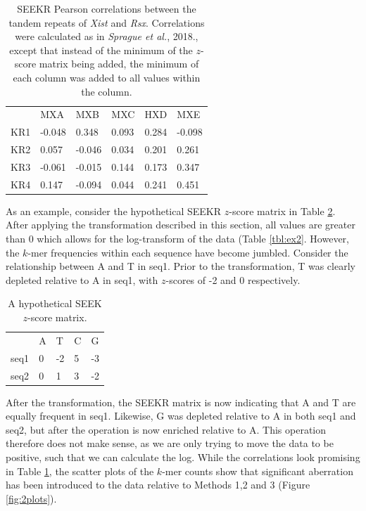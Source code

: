 \begin{table}[ht]
\begin{center}
\begin{tabular}{llllll}
&MXA & MXB                  & MXC                   & HXD                 & MXE                                      \\
KR1 & -0.048 & 0.348    & 0.093 & 0.284  & -0.098 \\
KR2 & 0.057  & -0.046 & 0.034 & 0.201 & 0.261  \\
KR3 & -0.061 & -0.015 & 0.144 & 0.173 & 0.347  \\
KR4 & 0.147   & -0.094  & 0.044 & 0.241 & 0.451 
\end{tabular}
\caption[Column-wise minimum addition to $z$-scores]{SEEKR Pearson correlations between the tandem repeats of \emph{Xist} and \emph{Rsx}. Correlations were calculated as in \emph{Sprague et al.}, 2018., except that instead of the minimum of the $z$-score matrix being added, the minimum of each column was added to all values within the column.}
\label{tbl:kmers4}
\end{center}
\end{table}
As an example, consider the hypothetical SEEKR $z$-score matrix in Table \ref{tbl:ex1}. After applying the transformation described in this section, all values are greater than 0 which allows for the log-transform of the data (Table \ref{tbl:ex2}. However, the $k$-mer frequencies within each sequence have become jumbled. Consider the relationship between A and T in seq1. Prior to the transformation, T was clearly depleted relative to A in seq1, with $z$-scores of -2 and 0 respectively. 
\begin{table}[h!]
\begin{center}
\begin{tabular}{lllll}
&A & T                   & C                  & G                                                    \\
seq1 & 0 & -2   & 5  & -3 \\
seq2 & 0   & 1 & 3 & -2 
\end{tabular}
\caption{A hypothetical SEEK $z$-score matrix.}
\label{tbl:ex1}
\end{center}
\end{table}
After the transformation, the SEEKR matrix is now indicating that A and T are equally frequent in seq1. Likewise, G was depleted relative to A in both seq1 and seq2, but after the operation is now enriched relative to A.  This operation therefore does not make sense, as we are only trying to move the data to be positive, such that we can calculate the log. While the correlations look promising in Table \ref{tbl:kmers4}, the scatter plots of the $k$-mer counts show that  significant aberration has been introduced to the data relative to Methods 1,2 and 3 (Figure \ref{fig:2plots}). 


